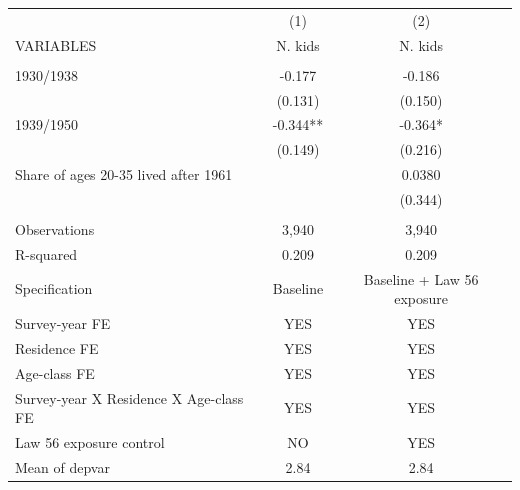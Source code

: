 \begin{tabular}{lcc} \hline
 & (1) & (2) \\
VARIABLES & N. kids & N. kids \\ \hline
 &  &  \\
1930/1938 & -0.177 & -0.186 \\
 & (0.131) & (0.150) \\
1939/1950 & -0.344** & -0.364* \\
 & (0.149) & (0.216) \\
Share of ages 20-35 lived after 1961 &  & 0.0380 \\
 &  & (0.344) \\
 &  &  \\
Observations & 3,940 & 3,940 \\
R-squared & 0.209 & 0.209 \\
Specification & Baseline & Baseline + Law 56 exposure \\
Survey-year FE & YES & YES \\
Residence FE & YES & YES \\
Age-class FE & YES & YES \\
Survey-year X Residence X Age-class FE & YES & YES \\
Law 56 exposure control & NO & YES \\
 Mean of depvar & 2.84 & 2.84 \\ \hline
\end{tabular}
